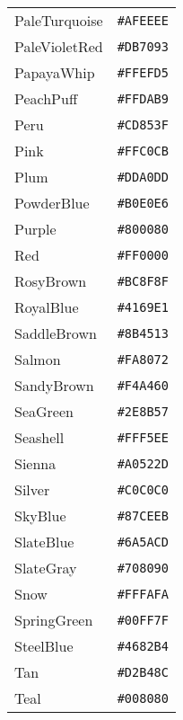 \documentclass[a4paper]{article}
\begin{document}
\begin{longtable}{|l|r|}
PaleTurquoise & \texttt{\#AFEEEE} \cellcolor[HTML]{AFEEEE} \\
PaleVioletRed & \texttt{\#DB7093} \cellcolor[HTML]{DB7093} \\
PapayaWhip & \texttt{\#FFEFD5} \cellcolor[HTML]{FFEFD5} \\
PeachPuff & \texttt{\#FFDAB9} \cellcolor[HTML]{FFDAB9} \\
Peru & \texttt{\#CD853F} \cellcolor[HTML]{CD853F} \\
Pink & \texttt{\#FFC0CB} \cellcolor[HTML]{FFC0CB} \\
Plum & \texttt{\#DDA0DD} \cellcolor[HTML]{DDA0DD} \\
PowderBlue & \texttt{\#B0E0E6} \cellcolor[HTML]{B0E0E6} \\
Purple & \texttt{\#800080} \cellcolor[HTML]{800080} \\
Red & \texttt{\#FF0000} \cellcolor[HTML]{FF0000} \\
RosyBrown & \texttt{\#BC8F8F} \cellcolor[HTML]{BC8F8F} \\
RoyalBlue & \texttt{\#4169E1} \cellcolor[HTML]{4169E1} \\
SaddleBrown & \texttt{\#8B4513} \cellcolor[HTML]{8B4513} \\
Salmon & \texttt{\#FA8072} \cellcolor[HTML]{FA8072} \\
SandyBrown & \texttt{\#F4A460} \cellcolor[HTML]{F4A460} \\
SeaGreen & \texttt{\#2E8B57} \cellcolor[HTML]{2E8B57} \\
Seashell & \texttt{\#FFF5EE} \cellcolor[HTML]{FFF5EE} \\
Sienna & \texttt{\#A0522D} \cellcolor[HTML]{A0522D} \\
Silver & \texttt{\#C0C0C0} \cellcolor[HTML]{C0C0C0} \\
SkyBlue & \texttt{\#87CEEB} \cellcolor[HTML]{87CEEB} \\
SlateBlue & \texttt{\#6A5ACD} \cellcolor[HTML]{6A5ACD} \\
SlateGray & \texttt{\#708090} \cellcolor[HTML]{708090} \\
Snow & \texttt{\#FFFAFA} \cellcolor[HTML]{FFFAFA} \\
SpringGreen & \texttt{\#00FF7F} \cellcolor[HTML]{00FF7F} \\
SteelBlue & \texttt{\#4682B4} \cellcolor[HTML]{4682B4} \\
Tan & \texttt{\#D2B48C} \cellcolor[HTML]{D2B48C} \\
Teal & \texttt{\#008080} \cellcolor[HTML]{008080} \\

\end{longtable}
\end{document}
